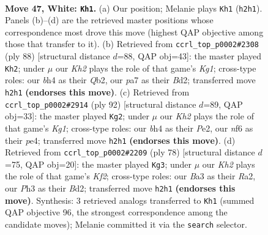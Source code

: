 \documentclass[11pt]{article}
\begin{document}
\clearpage

\begin{figure}[p]\centering
\begin{subfigure}{0.46\textwidth}\centering
\resizebox{\linewidth}{!}{%
\newchessgame
\chessboard[
  setfen={r1b3k1/pqp2pp1/1p3n2/7p/1P3P1b/B3Q2P/P1B3PK/R7 w - - 1 47},
  showmover=false,
  pgfstyle=straightmove, color=movearrow, markmove={h2-h1}
]}
\caption{}
\end{subfigure}\hfill
\begin{subfigure}{0.46\textwidth}\centering
\resizebox{\linewidth}{!}{%
\newchessgame
\chessboard[
  setfen={3r4/1p2q1pk/2p1p1bp/3nPp2/1PR5/4P2P/1Q1BBPP1/6K1 w - - 11 45},
  showmover=false,
  pgfstyle=straightmove, color=movearrow, markmove={g1-h2}
]}
\caption{}
\end{subfigure}
\\[4pt]
\begin{subfigure}{0.46\textwidth}\centering
\resizebox{\linewidth}{!}{%
\newchessgame
\chessboard[
  setfen={2r3k1/Q5p1/2b1qp2/4p2p/2p1p3/P1B3PP/1P2PP2/2R3K1 w - - 5 47},
  showmover=false,
  pgfstyle=straightmove, color=movearrow, markmove={g1-g2}
]}
\caption{}
\end{subfigure}\hfill
\begin{subfigure}{0.46\textwidth}\centering
\resizebox{\linewidth}{!}{%
\newchessgame
\chessboard[
  setfen={2rq2k1/5pp1/1p2n1b1/3pP3/6P1/4PP1p/RQ1BBK1P/8 w - - 1 40},
  showmover=false,
  pgfstyle=straightmove, color=movearrow, markmove={f2-g3}
]}
\caption{}
\end{subfigure}
\caption{\textbf{Move 47, White: \texttt{Kh1}.} (a) Our position; Melanie plays \texttt{Kh1} (\texttt{h2h1}). Panels (b)--(d) are the retrieved master positions whose correspondence most drove this move (highest QAP objective among those that transfer to it). (b) Retrieved from \texttt{ccrl\_top\_p0002\#2308} (ply 88) [structural distance $d$=88, QAP obj=43]: the master played \texttt{Kh2}; under $\mu$ our \emph{Kh2} plays the role of that game's \emph{Kg1}; cross-type roles: our \emph{b}h4 as their \emph{Q}b2, our \emph{p}a7 as their \emph{B}d2; transferred move \texttt{h2h1} \textbf{(endorses this move)}. (c) Retrieved from \texttt{ccrl\_top\_p0002\#2914} (ply 92) [structural distance $d$=89, QAP obj=33]: the master played \texttt{Kg2}; under $\mu$ our \emph{Kh2} plays the role of that game's \emph{Kg1}; cross-type roles: our \emph{b}h4 as their \emph{P}e2, our \emph{n}f6 as their \emph{p}e4; transferred move \texttt{h2h1} \textbf{(endorses this move)}. (d) Retrieved from \texttt{ccrl\_top\_p0002\#2209} (ply 78) [structural distance $d$=75, QAP obj=20]: the master played \texttt{Kg3}; under $\mu$ our \emph{Kh2} plays the role of that game's \emph{Kf2}; cross-type roles: our \emph{B}a3 as their \emph{R}a2, our \emph{P}h3 as their \emph{B}d2; transferred move \texttt{h2h1} \textbf{(endorses this move)}. Synthesis: 3 retrieved analogs transferred to \texttt{Kh1} (summed QAP objective 96, the strongest correspondence among the candidate moves); Melanie committed it via the \texttt{search} selector.}
\label{fig:thought-m92}
\end{figure}
\end{document}
